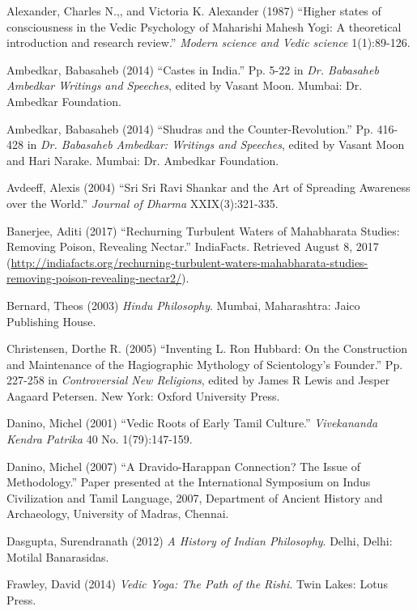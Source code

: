 \begin{thebibliography}{99}
 Alexander, Charles N.,, and Victoria K. Alexander (1987) “Higher states of consciousness in the Vedic Psychology of Maharishi Mahesh Yogi: A theoretical introduction and research review.” \textit{Modern science and Vedic science} 1(1):89-126.

  Ambedkar, Babasaheb (2014) “Castes in India.” Pp. 5-22 in \textit{Dr. Babasaheb Ambedkar Writings and Speeches}, edited by Vasant Moon. Mumbai: Dr. Ambedkar Foundation.

  Ambedkar, Babasaheb (2014) “Shudras and the Counter-Revolution.” Pp. 416-428 in \textit{Dr. Babasaheb Ambedkar: Writings and Speeches}, edited by Vasant Moon and Hari Narake. Mumbai: Dr. Ambedkar Foundation.

  Avdeeff, Alexis (2004) “Sri Sri Ravi Shankar and the Art of Spreading Awareness over the World.” \textit{Journal of Dharma} XXIX(3):321-335.

  Banerjee, Aditi (2017) “Rechurning Turbulent Waters of Mahabharata Studies: Removing Poison, Revealing Nectar.” IndiaFacts. Retrieved August 8, 2017 (\url{http://indiafacts.org/rechurning-turbulent-waters-mahabharata-studies-removing-poison-revealing-nectar2/}).

  Bernard, Theos (2003) \textit{Hindu Philosophy}. Mumbai, Maharashtra: Jaico Publishing House.

  Christensen, Dorthe R. (2005) “Inventing L. Ron Hubbard: On the Construction and Maintenance of the Hagiographic Mythology of Scientology's Founder.” Pp. 227-258 in \textit{Controversial New Religions}, edited by James R Lewis and Jesper Aagaard Petersen. New York: Oxford University Press.

  Danino, Michel (2001) “Vedic Roots of Early Tamil Culture.” \textit{Vivekananda Kendra Patrika} 40 No. 1(79):147-159.

  Danino, Michel (2007) “A Dravido-Harappan Connection? The Issue of Methodology.” Paper presented at the International Symposium on Indus Civilization and Tamil Language, 2007, Department of Ancient History and Archaeology, University of Madras, Chennai.

  Dasgupta, Surendranath (2012) \textit{A History of Indian Philosophy}. Delhi, Delhi: Motilal Banarasidas.

  Frawley, David (2014) \textit{Vedic Yoga: The Path of the Rishi}. Twin Lakes: Lotus Press.


\end{thebibliography}
